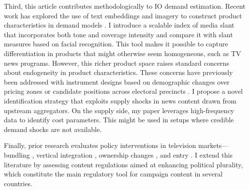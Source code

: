 \documentclass[12pt]{article}
\begin{document}
Third, this article contributes methodologically to IO demand estimation. Recent work has explored the use of text embeddings and imagery to construct product characteristics in demand models \citep{compiani2025demandestimationtextimage}. I introduce a scalable index of media slant that incorporates both tone and coverage intensity and compare it with slant measures based on facial recognition. This tool makes it possible to capture differentiation in products that might otherwise seem homogeneous, such as TV news programs. However, this richer product space raises standard concerns about endogeneity in product characteristics. These concerns have previously been addressed with instrument designs based on demographic changes over pricing zones \citep{fan} or candidate positions across electoral precincts \citep{longuet-marx2025party}. I propose a novel identification strategy that exploits supply shocks in news content drawn from upstream aggregators. On the supply side, my paper leverages high-frequency data to identify cost parameters. This might be used in setups where credible demand shocks are not available. 


Finally, prior research evaluates policy interventions in television markets—bundling \citep{crawford_yurukoglu}, vertical integration \citep{crawford_vertical}, ownership changes \citep{MARTIN_McCRAIN_2019,CageHengelHerveUrvoy2022}, and entry \citep{prat_stromberg_entry}. I extend this literature by assessing content regulations aimed at enhancing political plurality, which constitute the main regulatory tool for campaign content in several countries.
\end{document}
